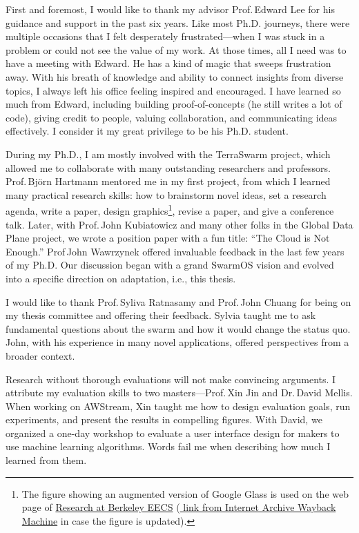 \documentclass[thesis.tex]{subfiles}
\begin{document}
\begin{acknowledgements}

  First and foremost, I would like to thank my advisor Prof.\,Edward Lee for his
  guidance and support in the past six years. Like most Ph.D. journeys, there
  were multiple occasions that I felt desperately frustrated---when I was stuck
  in a problem or could not see the value of my work. At those times, all I need
  was to have a meeting with Edward. He has a kind of magic that sweeps
  frustration away. With his breath of knowledge and ability to connect insights
  from diverse topics, I always left his office feeling inspired and
  encouraged. I have learned so much from Edward, including building
  proof-of-concepts (he still writes a lot of code), giving credit to people,
  valuing collaboration, and communicating ideas effectively. I consider it my
  great privilege to be his Ph.D. student.

  During my Ph.D., I am mostly involved with the TerraSwarm project, which
  allowed me to collaborate with many outstanding researchers and
  professors. Prof.\,Bj\"orn Hartmann mentored me in my first project, from
  which I learned many practical research skills: how to brainstorm novel ideas,
  set a research agenda, write a paper, design graphics\footnote{The figure
    showing an augmented version of Google Glass is used on the web page of
    \href{https://eecs.berkeley.edu/research}{Research at Berkeley EECS}
    (\href{https://web.archive.org/web/20171101140044/https://eecs.berkeley.edu/research}{
      link from Internet Archive Wayback Machine} in case the figure is
    updated).}, revise a paper, and give a conference talk. Later, with
  Prof.\,John Kubiatowicz and many other folks in the Global Data Plane project,
  we wrote a position paper with a fun title: ``The Cloud is Not Enough.''
  Prof\,John Wawrzynek offered invaluable feedback in the last few years of my
  Ph.D. Our discussion began with a grand SwarmOS vision and evolved into a
  specific direction on adaptation, i.e., this thesis.

  I would like to thank Prof.\,Syliva Ratnasamy and Prof.\,John Chuang for being
  on my thesis committee and offering their feedback. Sylvia taught me to ask
  fundamental questions about the swarm and how it would change the status
  quo. John, with his experience in many novel applications, offered
  perspectives from a broader context.

  Research without thorough evaluations will not make convincing arguments. I
  attribute my evaluation skills to two masters---Prof.\,Xin Jin and Dr.\,David
  Mellis. When working on AWStream, Xin taught me how to design evaluation
  goals, run experiments, and present the results in compelling figures. With
  David, we organized a one-day workshop to evaluate a user interface design for
  makers to use machine learning algorithms. Words fail me when describing how
  much I learned from them.


\end{acknowledgements}
\end{document}
